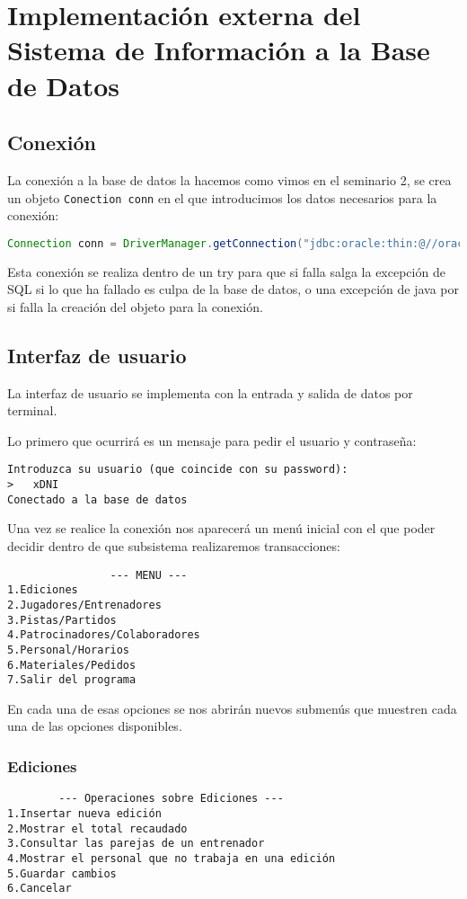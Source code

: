 \section{Implementación externa del Sistema de Información a la Base de Datos}
\subsection{Conexión}
La conexión a la base de datos la hacemos como vimos en el seminario 2, se crea
un objeto \texttt{Conection conn} en el que introducimos los datos necesarios para
la conexión:
\begin{lstlisting}[language=java]
Connection conn = DriverManager.getConnection("jdbc:oracle:thin:@//oracle0.ugr.es:1521/practbd.oracle0.ugr.es", "xDNI", "xDNI")
\end{lstlisting}

Esta conexión se realiza dentro de un try para que si falla salga la excepción de
SQL si lo que ha fallado es culpa de la base de datos, o una excepción de java por
si falla la creación del objeto para la conexión.

\subsection{Interfaz de usuario}
La interfaz de usuario se implementa con la entrada y salida de datos por
terminal.

Lo primero que ocurrirá es un mensaje para pedir el usuario y contraseña:
\begin{lstlisting}
Introduzca su usuario (que coincide con su password):
>	xDNI
Conectado a la base de datos
\end{lstlisting}

Una vez se realice la conexión nos aparecerá un menú inicial con el que poder
decidir dentro de que subsistema realizaremos transacciones:

\begin{lstlisting}
				--- MENU ---
1.Ediciones
2.Jugadores/Entrenadores
3.Pistas/Partidos
4.Patrocinadores/Colaboradores
5.Personal/Horarios
6.Materiales/Pedidos
7.Salir del programa
\end{lstlisting}

En cada una de esas opciones se nos abrirán nuevos submenús que muestren cada
una de las opciones disponibles.

\subsubsection{Ediciones}
\begin{lstlisting}
		--- Operaciones sobre Ediciones ---
1.Insertar nueva edición
2.Mostrar el total recaudado
3.Consultar las parejas de un entrenador
4.Mostrar el personal que no trabaja en una edición
5.Guardar cambios
6.Cancelar
\end{lstlisting}

